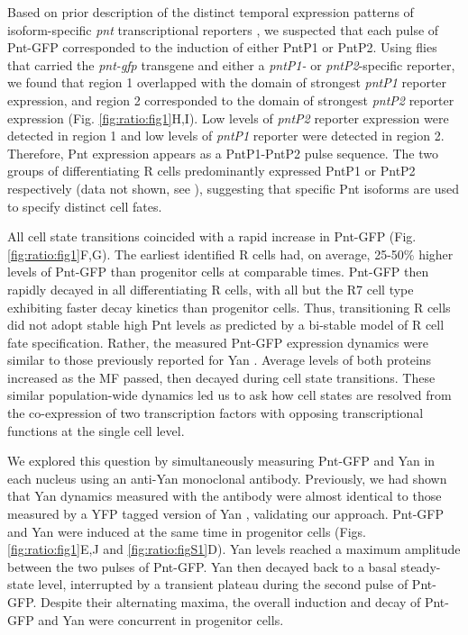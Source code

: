 Based on prior description of the distinct temporal expression patterns of isoform-specific \textit{pnt} transcriptional reporters \cite{Shwartz2013}, we suspected that each pulse of Pnt-GFP corresponded to the induction of either PntP1 or PntP2. Using flies that carried the \textit{pnt-gfp} transgene and either a \textit{pntP1-} or \textit{pntP2}-specific reporter, we found that region 1 overlapped with the domain of strongest \textit{pntP1} reporter expression, and region 2 corresponded to the domain of strongest \textit{pntP2} reporter expression (Fig. \ref{fig:ratio:fig1}H,I). Low levels of \textit{pntP2} reporter expression were detected in region 1 and low levels of \textit{pntP1} reporter were detected in region 2. Therefore, Pnt expression appears as a PntP1-PntP2 pulse sequence. The two groups of differentiating R cells predominantly expressed PntP1 or PntP2 respectively (data not shown, see \cite{Pelaez2016}), suggesting that specific Pnt isoforms are used to specify distinct cell fates.

All cell state transitions coincided with a rapid increase in Pnt-GFP (Fig. \ref{fig:ratio:fig1}F,G). The earliest identified R cells had, on average, 25-50\% higher levels of Pnt-GFP than progenitor cells at comparable times. Pnt-GFP then rapidly decayed in all differentiating R cells, with all but the R7 cell type exhibiting faster decay kinetics than progenitor cells. Thus, transitioning R cells did not adopt stable high Pnt levels as predicted by a bi-stable model of R cell fate specification. Rather, the measured Pnt-GFP expression dynamics were similar to those previously reported for Yan \cite{Pelaez2015a}. Average levels of both proteins increased as the MF passed, then decayed during cell state transitions. These similar population-wide dynamics led us to ask how cell states are resolved from the co-expression of two transcription factors with opposing transcriptional functions at the single cell level.

We explored this question by simultaneously measuring Pnt-GFP and Yan in each nucleus using an anti-Yan monoclonal antibody. Previously, we had shown that Yan dynamics measured with the antibody were almost identical to those measured by a YFP tagged version of Yan \cite{Pelaez2015a}, validating our approach. Pnt-GFP and Yan were induced at the same time in progenitor cells (Figs. \ref{fig:ratio:fig1}E,J and \ref{fig:ratio:figS1}D). Yan levels reached a maximum amplitude between the two pulses of Pnt-GFP. Yan then decayed back to a basal steady-state level, interrupted by a transient plateau during the second pulse of Pnt-GFP. Despite their alternating maxima, the overall induction and decay of Pnt-GFP and Yan were concurrent in progenitor cells.


